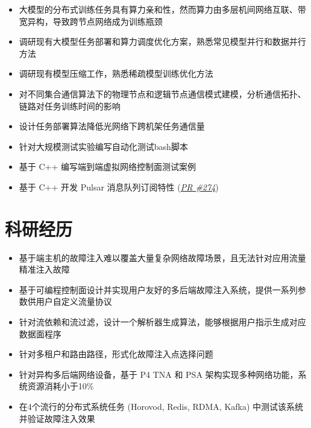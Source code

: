 \documentclass{resume}
\begin{document}
\begin{itemize}[parsep=0.5ex]
  \item 大模型的分布式训练任务具有算力亲和性，然而算力由多层机间网络互联、带宽异构，导致跨节点网络成为训练瓶颈
  \item 调研现有大模型任务部署和算力调度优化方案，熟悉常见模型并行和数据并行方法
  \item 调研现有模型压缩工作，熟悉稀疏模型训练优化方法
  \item 对不同集合通信算法下的物理节点和逻辑节点通信模式建模，分析通信拓扑、链路对任务训练时间的影响
  \item 设计任务部署算法降低光网络下跨机架任务通信量
\end{itemize}

\begin{itemize}[parsep=0.5ex]
  \item 针对大规模测试实验编写自动化测试bash脚本
  \item 基于 C++ 编写端到端虚拟网络控制面测试案例
  \item 基于 C++ 开发 Pulsar 消息队列订阅特性 (\href{https://github.com/futurewei-cloud/alcor-control-agent/pull/274}{\textit{PR \#274}})
\end{itemize}

\section{科研经历}

\begin{itemize}[parsep=0.5ex]
  \item 基于端主机的故障注入难以覆盖大量复杂网络故障场景，且无法针对应用流量精准注入故障
  \item 基于可编程控制面设计并实现用户友好的多后端故障注入系统，提供一系列参数供用户自定义流量协议
  \item 针对流依赖和流过滤，设计一个解析器生成算法，能够根据用户指示生成对应数据面程序
  \item 针对多租户和路由路径，形式化故障注入点选择问题
  \item 针对异构多后端网络设备，基于 P4 TNA 和 PSA 架构实现多种网络功能，系统资源消耗小于10\%
  \item 在4个流行的分布式系统任务 (Horovod, Redis, RDMA, Kafka) 中测试该系统并验证故障注入效果
\end{itemize}
\end{document}
